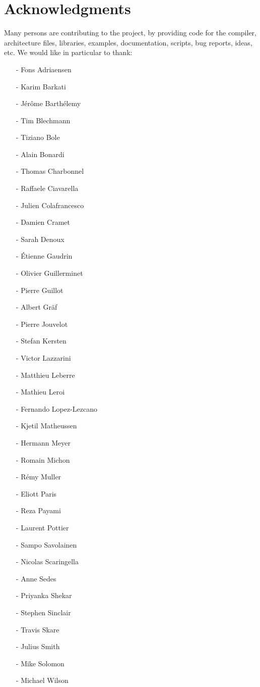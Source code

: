 \chapter{Acknowledgments}
\label{sec:acknowledgments}

Many persons are contributing to the \faust project, by providing code for the compiler, architecture files, libraries, examples, documentation, scripts, bug reports, ideas, etc. We would like in particular to thank:

\begin{itemize}
\setlength\itemsep{0em}
\item[-]Fons Adriaensen	
\item[-]Karim Barkati
\item[-]J\'er\^ome Barth\'elemy
\item[-]Tim Blechmann
\item[-]Tiziano Bole	
\item[-]Alain Bonardi
\item[-]Thomas Charbonnel
\item[-]Raffaele Ciavarella
\item[-]Julien Colafrancesco
\item[-]Damien Cramet
\item[-]Sarah Denoux
\item[-]\'Etienne Gaudrin
\item[-]Olivier Guillerminet
\item[-]Pierre Guillot
\item[-]Albert Gr\"af
\item[-]Pierre Jouvelot
\item[-]Stefan Kersten
\item[-]Victor Lazzarini
\item[-]Matthieu Leberre
\item[-]Mathieu Leroi
\item[-]Fernando Lopez-Lezcano
\item[-]Kjetil Matheussen
\item[-]Hermann Meyer
\item[-]Romain Michon
\item[-]R\'emy Muller
\item[-]Eliott Paris
\item[-]Reza Payami
\item[-]Laurent Pottier
\item[-]Sampo Savolainen
\item[-]Nicolas Scaringella
\item[-]Anne Sedes
\item[-]Priyanka Shekar
\item[-]Stephen Sinclair
\item[-]Travis Skare
\item[-]Julius Smith
\item[-]Mike Solomon
\item[-]Michael Wilson
\end{itemize}
